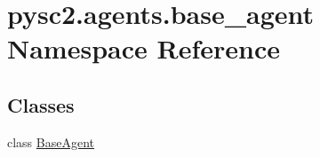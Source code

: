 \hypertarget{namespacepysc2_1_1agents_1_1base__agent}{}\section{pysc2.\+agents.\+base\+\_\+agent Namespace Reference}
\label{namespacepysc2_1_1agents_1_1base__agent}
\subsection*{Classes}
\begin{DoxyCompactItemize}
\item 
class \mbox{\hyperlink{classpysc2_1_1agents_1_1base__agent_1_1_base_agent}{Base\+Agent}}
\end{DoxyCompactItemize}
